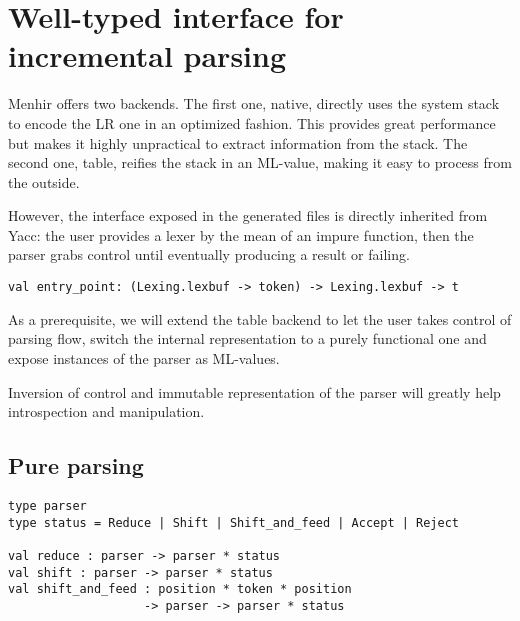 \documentclass[twoside,a4paper]{article}
\begin{document}
\section{Well-typed interface for incremental parsing}



Menhir offers two backends.  The first one, native, directly uses the system
stack to encode the LR one in an optimized fashion.  This provides great
performance but makes it highly unpractical to extract information from the
stack.  The second one, table, reifies the stack in an ML-value, making it easy
to process from the outside.


However, the interface exposed in the generated files is directly inherited
from Yacc: the user provides a lexer by the mean of an impure function, then
the parser grabs control until eventually producing a result or failing.

\begin{verbatim}
val entry_point: (Lexing.lexbuf -> token) -> Lexing.lexbuf -> t
\end{verbatim}

As a prerequisite, we will extend the table backend to let the user takes
control of parsing flow, switch the internal representation to a purely
functional one and expose instances of the parser as ML-values.

Inversion of control and immutable representation of the parser will greatly
help introspection and manipulation.


\subsection{Pure parsing}

\begin{verbatim}
type parser
type status = Reduce | Shift | Shift_and_feed | Accept | Reject

val reduce : parser -> parser * status
val shift : parser -> parser * status
val shift_and_feed : position * token * position 
                   -> parser -> parser * status 
\end{verbatim}
\end{document}

